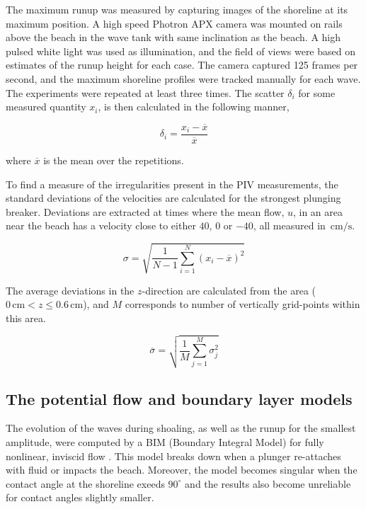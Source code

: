 \documentclass[review, authoryear]{elsarticle}
\newcommand{\cm}{\,\mbox{cm}}
\newcommand{\cmps}{\,\mbox{cm/s}}
\begin{document}
The maximum runup was measured by capturing images of the shoreline at its maximum position. A high speed Photron APX  camera was mounted on rails above the beach in the wave tank with same inclination as the beach. A high pulsed white light was used as illumination, and the field of views were based on estimates of the runup height for each case. The camera captured 125 frames per second, and the maximum shoreline profiles were tracked manually for each wave. The experiments were repeated at least three times. The scatter $\delta_i$ for some measured quantity $x_i$, is then calculated in the following manner,

\begin{equation}
\delta_i=\frac{x_i-\overline{x}}{\overline{x}}
\end{equation}

where $\overline{x}$ is the mean over the repetitions.


To find a measure of the irregularities present in the PIV measurements, the standard deviations of the velocities are calculated for the strongest plunging breaker. Deviations are extracted at times where the mean flow, $u$, in an area near the beach has a velocity close to either
$40$, $0$ or $-40$, all measured in $\cmps$.

\begin{equation}
\sigma=\sqrt{\frac{1}{N-1}\sum_{i=1}^{N}(x_i-\overline{x})^2} 
\end{equation}


The average deviations in the $z$-direction are calculated from the area ($0\cm < z \le 0.6\cm$), and $M$ corresponds to number of vertically grid-points within this area.

\begin{equation}
\overline{\sigma}=\sqrt{\frac{1}{M}\sum_{j=1}^{M}\sigma_j^2}
\label{av_g}
\end{equation}
 
\subsection{The potential flow and boundary layer models}
The evolution of the waves during shoaling, as well as the runup for the smallest amplitude, were 
computed by a BIM (Boundary Integral Model) for fully nonlinear, inviscid flow \citep{pedersen2013runup}.
This model breaks down when a plunger re-attaches with fluid or impacts the beach. Moreover, the
model  becomes singular when the contact angle at the shoreline exeeds $90^\circ$  and the results also become unreliable for contact angles slightly smaller.  
\end{document}

